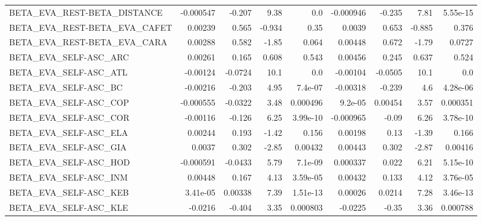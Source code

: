 \begin{tabular}{lrrrrrrrr}
BETA\_EVA\_REST-BETA\_DISTANCE            &   -0.000547 &       -0.207 &    9.38 &      0.0 &  -0.000946 &      -0.235 &         7.81 &      5.55e-15 \\
BETA\_EVA\_REST-BETA\_EVA\_CAFET           &     0.00239 &        0.565 &  -0.934 &     0.35 &     0.0039 &       0.653 &       -0.885 &         0.376 \\
BETA\_EVA\_REST-BETA\_EVA\_CARA            &     0.00288 &        0.582 &   -1.85 &    0.064 &    0.00448 &       0.672 &        -1.79 &        0.0727 \\
BETA\_EVA\_SELF-ASC\_ARC                  &     0.00261 &        0.165 &   0.608 &    0.543 &    0.00456 &       0.245 &        0.637 &         0.524 \\
BETA\_EVA\_SELF-ASC\_ATL                  &    -0.00124 &      -0.0724 &    10.1 &      0.0 &   -0.00104 &     -0.0505 &         10.1 &           0.0 \\
BETA\_EVA\_SELF-ASC\_BC                   &    -0.00216 &       -0.203 &    4.95 &  7.4e-07 &   -0.00318 &      -0.239 &          4.6 &      4.28e-06 \\
BETA\_EVA\_SELF-ASC\_COP                  &   -0.000555 &      -0.0322 &    3.48 & 0.000496 &    9.2e-05 &     0.00454 &         3.57 &      0.000351 \\
BETA\_EVA\_SELF-ASC\_COR                  &    -0.00116 &       -0.126 &    6.25 & 3.99e-10 &  -0.000965 &       -0.09 &         6.26 &      3.78e-10 \\
BETA\_EVA\_SELF-ASC\_ELA                  &     0.00244 &        0.193 &   -1.42 &    0.156 &    0.00198 &        0.13 &        -1.39 &         0.166 \\
BETA\_EVA\_SELF-ASC\_GIA                  &      0.0037 &        0.302 &   -2.85 &  0.00432 &    0.00443 &       0.302 &        -2.87 &       0.00416 \\
BETA\_EVA\_SELF-ASC\_HOD                  &   -0.000591 &      -0.0433 &    5.79 &  7.1e-09 &   0.000337 &       0.022 &         6.21 &      5.15e-10 \\
BETA\_EVA\_SELF-ASC\_INM                  &     0.00448 &        0.167 &    4.13 & 3.59e-05 &    0.00432 &       0.133 &         4.12 &      3.76e-05 \\
BETA\_EVA\_SELF-ASC\_KEB                  &    3.41e-05 &      0.00338 &    7.39 & 1.51e-13 &    0.00026 &      0.0214 &         7.28 &      3.46e-13 \\
BETA\_EVA\_SELF-ASC\_KLE                  &     -0.0216 &       -0.404 &    3.35 & 0.000803 &    -0.0225 &       -0.35 &         3.36 &      0.000788 \\

\end{tabular}
